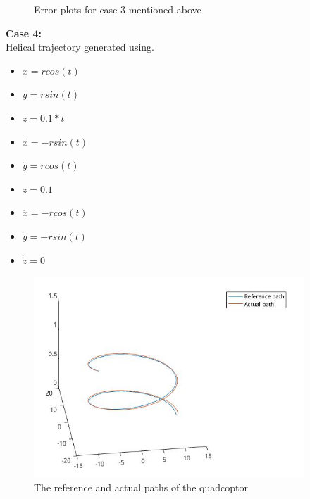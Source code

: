 \documentclass[12pt,fleqn]{article}
\begin{document}
\begin{figure}[H]
\begin{tabular}{cc}
\end{tabular}
\caption{Error plots for case 3 mentioned above}
\label{case3}
\end{figure}

\textbf{Case 4:}\\
Helical trajectory generated using.
\begin{itemize}
\item $ x = r cos(t) $
\item $ y = r sin(t) $
\item $ z = 0.1 * t $
\item $ \dot{x} = -r sin(t) $
\item $ \dot{y} = r cos(t) $
\item $ \dot{z} = 0.1 $
\item $ \ddot{x} = -r cos(t) $
\item $ \ddot{y} = -r sin(t) $
\item $ \ddot{z} = 0 $
\end{itemize}

\begin{figure}[H]
\centering
\includegraphics[width=4in]{path5.jpg}
\caption{The reference and actual paths of the quadcoptor}
\label{pathfig}
\end{figure}
\end{document}
